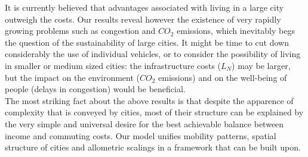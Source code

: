 It is currently believed that advantages associated with living in a large city
outweigh the costs. Our results reveal however the existence of very rapidly
growing problems such as congestion and $CO_2$ emissions, which inevitably begs
the question of the sustainability of large cities. It might be time to cut down
considerably the use of individual vehicles, or to consider the possibility of
living in smaller or medium sized cities: the infrastructure costs ($L_N$) may
be larger, but the impact on the environment ($CO_2$ emissions) and on the
well-being of people (delays in congestion) would be beneficial.\\

The most striking fact about the above results is that despite the apparence of
complexity that is conveyed by cities, most of their structure can be explained
by the very simple and universal desire for the best achievable balance between
income and commuting costs. Our model unifies mobility patterns, spatial
structure of cities and allometric scalings in a framework that can be built
upon. 
